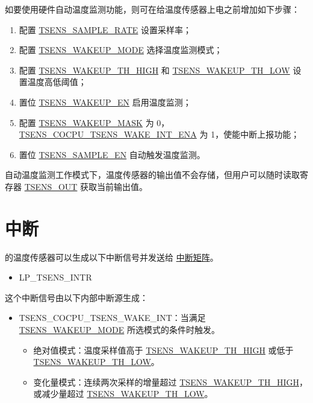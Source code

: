 \documentclass[main\_\_CN.tex]{subfiles}
\begin{document}
如要使用硬件自动温度监测功能，则可在给温度传感器上电之前增加如下步骤：

\begin{enumerate}
    \item 配置 \hyperref[fielddesc:TSENSSAMPLERATE]{TSENS\_SAMPLE\_RATE} 设置采样率；
    \item 配置 \hyperref[fielddesc:TSENSWAKEUPMODE]{TSENS\_WAKEUP\_MODE} 选择温度监测模式；
    \item 配置 \hyperref[fielddesc:TSENSWAKEUPTHHIGH]{TSENS\_WAKEUP\_TH\_HIGH} 和 \hyperref[fielddesc:TSENSWAKEUPTHLOW]{TSENS\_WAKEUP\_TH\_LOW} 设置温度高低阈值；
    \item 置位 \hyperref[fielddesc:TSENSWAKEUPEN]{TSENS\_WAKEUP\_EN} 启用温度监测；
    \item 配置 \hyperref[fielddesc:TSENSWAKEUPMASK]{TSENS\_WAKEUP\_MASK} 为 0，\hyperref[fielddesc:TSENSCOCPUTSENSWAKEINTENA]{TSENS\_COCPU\_TSENS\_WAKE\_INT\_ENA} 为 1，使能中断上报功能；
    \item 置位 \hyperref[fielddesc:TSENSSAMPLEEN]{TSENS\_SAMPLE\_EN} 自动触发温度监测。
\end{enumerate}

自动温度监测工作模式下，温度传感器的输出值不会存储，但用户可以随时读取寄存器 \hyperref[fielddesc:TSENSOUT]{TSENS\_OUT} 获取当前输出值。

\section{中断}

\chipname{} 的温度传感器可以生成以下中断信号并发送给 \hyperref[mod:intmtrx]{中断矩阵}。

\begin{itemize}
    \item LP\_TSENS\_INTR
\end{itemize}

这个中断信号由以下内部中断源生成：

\begin{itemize}
    \item \label{interrupt:TSENSCOCPUTSENSWAKEINT} TSENS\_COCPU\_TSENS\_WAKE\_INT：当满足 \hyperref[fielddesc:TSENSWAKEUPMODE]{TSENS\_WAKEUP\_MODE} 所选模式的条件时触发。
    \begin{itemize}
        \item 绝对值模式：温度采样值高于 \hyperref[fielddesc:TSENSWAKEUPTHHIGH]{TSENS\_WAKEUP\_TH\_HIGH} 或低于 \hyperref[fielddesc:TSENSWAKEUPTHLOW]{TSENS\_WAKEUP\_TH\_LOW}。
        \item 变化量模式：连续两次采样的增量超过 \hyperref[fielddesc:TSENSWAKEUPTHHIGH]{TSENS\_WAKEUP\_TH\_HIGH}，或减少量超过 \hyperref[fielddesc:TSENSWAKEUPTHLOW]{TSENS\_WAKEUP\_TH\_LOW}。
    \end{itemize}
\end{itemize}
\end{document}
